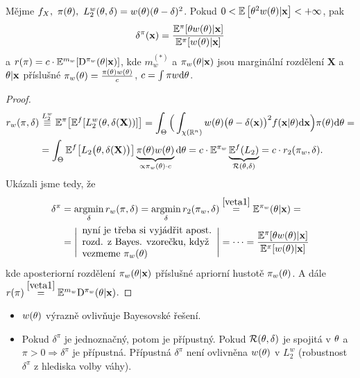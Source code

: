 \begin{theorem}
	Mějme $f_X,~\pi(\theta),~L_2^w(\theta,\delta)=w(\theta)(\theta-\delta)^2$. Pokud $0<\mathbb{E}\left[ \theta^2w(\theta)|\textbf{x} \right]<+\infty$, pak $$\delta^\pi(\textbf{x})=\frac{\mathbb{E}^\pi[{\theta w(\theta)|\textbf{x}}]}{\mathbb{E}^{\pi}[{w(\theta)|\textbf{x}}]}$$
	a $r(\pi)=c\cdot\mathbb{E}^{m_w}[\mathrm{D}^{\pi_w}(\theta|\textbf{x})]$, kde $m_w^{(*)}$ a $\pi_w(\theta|\textbf{x})$ jsou marginální rozdělení $\textbf{X}$ a $\theta|\textbf{x}$ příslušné $\pi_w(\theta)=\frac{\pi(\theta)w(\theta)}{c}$, $c=\int\pi w\mathrm{d}\theta$.
	\begin{proof}
		\[
		\begin{split}
		r_w(\pi,\delta)&\stackrel{L_2^w}{\equiv}\mathbb{E}^\pi\big[\mathbb{E}^f[L_2^w(\theta,\delta(\textbf{X}))]\big]=\int_\Theta\Big(\int_{\chi(\mathbb{R}^n)} w(\theta)\big(\theta-\delta(\textbf{x})\big)^2 f(\textbf{x}|\theta)\mathrm{d}\textbf{x}\Big)\pi(\theta)\mathrm{d}\theta=\\
		&= \int_\Theta \mathbb{E}^f\big[L_2\big(\theta,\delta(\textbf{X})\big)\big]\underbrace{ \pi(\theta)w(\theta)}_{\propto \pi_w(\theta)\cdot c}\mathrm{d}\theta = c\cdot\mathbb{E}^{\pi_w}\underbrace{\mathbb{E}^f (L_2)}_{\mathcal{R}(\theta,\delta)}=c\cdot r_2(\pi_w,\delta).
		\end{split}
		\]
		Ukázali jsme tedy, že  
		\begin{align*}
		\delta^\pi&=\mathop{\mathrm{argmin}}_\delta r_w(\pi,\delta)=\mathop{\mathrm{argmin}}_\delta r_2(\pi_w,\delta)\stackrel{\ref{veta1}}{=}\mathbb{E}^{\pi_w}(\theta|\textbf{x})=\\
		&=\Bigg| 
		\begin{array}{l}
		\text{nyní je třeba si vyjádřit apost.} \\
		\text{rozd. z Bayes. vzorečku, když} \\
		\text{vezmeme } \pi_{w}(\theta)
		\end{array}
		 \Bigg|=\dots=\frac{\mathbb{E}^\pi[{\theta w(\theta)|\textbf{x}}]}{\mathbb{E}^{\pi}[{w(\theta)|\textbf{x}}]}
		 \end{align*} 
		kde aposteriorní rozdělení $\pi_w(\theta|\textbf{x})$ příslušné apriorní hustotě $\pi_w(\theta)$. A dále $r(\pi)\stackrel{\ref{veta1}}{=}\mathbb{E}^{m_w}\mathrm{D}^{\pi_w}(\theta|\textbf{x})$.
	\end{proof}
\end{theorem}
\begin{remark}\begin{itemize}
		\item $w(\theta)$ výrazně ovlivňuje Bayesovské řešení.
		\item Pokud $\delta^\pi$ je jednoznačný, potom je přípustný. Pokud $\mathcal{R}(\theta,\delta)$ je spojitá v $\theta$ a $\pi>0\Rightarrow\delta^\pi$ je přípustná. Přípustná $\delta^\pi$ není ovlivněna $w(\theta)$ v $L_2^w$ (robustnost $\delta^\pi$ z hlediska volby váhy).
	\end{itemize}
\end{remark}

